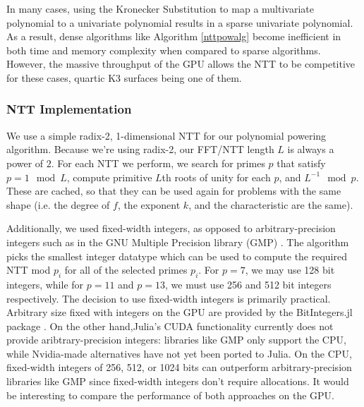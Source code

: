 In many cases, using the Kronecker Substitution to map a multivariate polynomial to a univariate polynomial results in  a sparse univariate polynomial. As a result, dense algorithms like Algorithm \ref{nttpowalg} become inefficient in both time and memory complexity when compared to sparse algorithms. However, the massive throughput of the GPU allows the NTT to be competitive for these cases, 
quartic K3 surfaces being one of them.

\subsubsection{NTT Implementation}

We use a simple radix-2, 1-dimensional NTT for our polynomial powering algorithm. Because we're using radix-2, our 
FFT/NTT length $L$ is always a power of $2$. 
For each NTT we perform, we search for primes $p$ that satisfy $p = 1 \mod L$, compute primitive $L$th roots of unity for each $p$, and $L^{-1} \mod p$. 
These are cached, so that they can be used again for problems with the same shape 
(i.e. the degree of \(f\), the exponent \(k\), and the characteristic are the same).



Additionally, we used fixed-width integers, as opposed to arbitrary-precision integers 
such as in the GNU Multiple Precision library (GMP) \cite{gnu-2024-gmp}.
The algorithm picks the smallest integer datatype which can be used to compute
the required NTT mod \(p_{i}\) for all of the selected primes \(p_{i}\).
For \(p=7\), we may use 128 bit integers, while for \(p=11\) and \(p=13\),
we must use 256 and 512 bit integers respectively.
The decision
to use fixed-width integers is primarily practical. 
Arbitrary size fixed with integers
on the GPU are provided by the BitIntegers.jl package 
\cite{fourquet-2024-bitintegers-jl}.
On the other hand,Julia's CUDA functionality currently does not provide
aribtrary-precision integers:
libraries like GMP only support the CPU, while 
Nvidia-made alternatives have not yet been ported to Julia.
On the CPU, fixed-width integers of 256, 512, or 1024 bits
can outperform arbitrary-precision libraries like GMP 
since fixed-width integers don't require allocations.
It would be interesting to compare the performance of both
approaches on the GPU.

